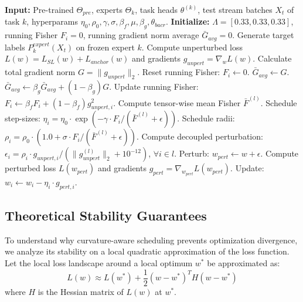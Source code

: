 \documentclass{article}
\theoremstyle{plain}
\theoremstyle{definition}
\theoremstyle{remark}
\begin{document}
\begin{algorithm}[tb]
\caption{Fisher-Guided Curvature-Aware Step-Size Scheduling (FG-CASS)}
\label{alg:fg-cass}
\begin{algorithmic}[1]
\STATE \textbf{Input:} Pre-trained $\Theta_{pre}$, experts $\Theta_k$, task heads $\theta^{(k)}$, test stream batches $X_t$ of task $k$, hyperparams $\eta_0, \rho_0, \gamma, \sigma, \beta_f, \mu, \beta_g, \theta_{bacr}$.
\STATE \textbf{Initialize:} $\Lambda = [0.33, 0.33, 0.33]$, running Fisher $F_i = 0$, running gradient norm average $\bar{G}_{avg} = 0$.
    \STATE Generate target labels $P_k^{expert}(X_t)$ on frozen expert $k$.
    \STATE Compute unperturbed loss $L(w) = L_{SL}(w) + L_{anchor}(w)$ and gradients $g_{unpert} = \nabla_w L(w)$.
    \STATE Calculate total gradient norm $G = \|g_{unpert}\|_2$.
        \STATE Reset running Fisher: $F_i \leftarrow 0$.
        \STATE $\bar{G}_{avg} \leftarrow G$.
    \ELSE
        \STATE $\bar{G}_{avg} \leftarrow \beta_g \bar{G}_{avg} + (1 - \beta_g) G$.
    \ENDIF
    \STATE Update running Fisher: $F_i \leftarrow \beta_f F_i + (1 - \beta_f) g_{unpert, i}^2$.
    \STATE Compute tensor-wise mean Fisher $\bar{F}^{(l)}$.
    \STATE Schedule step-sizes: $\eta_i = \eta_0 \cdot \exp(-\gamma \cdot F_i / (\bar{F}^{(l)} + \epsilon))$.
    \STATE Schedule radii: $\rho_i = \rho_0 \cdot (1.0 + \sigma \cdot F_i / (\bar{F}^{(l)} + \epsilon))$.
    \STATE Compute decoupled perturbation: $\epsilon_i = \rho_i \cdot g_{unpert, i} / (\|g_{unpert}^{(l)}\|_2 + 10^{-12})$, $\forall i \in l$.
    \STATE Perturb: $w_{pert} \leftarrow w + \epsilon$.
    \STATE Compute perturbed loss $L(w_{pert})$ and gradients $g_{pert} = \nabla_{w_{pert}} L(w_{pert})$.
    \STATE Update: $w_i \leftarrow w_i - \eta_i \cdot g_{pert, i}$.
\ENDFOR
\end{algorithmic}
\end{algorithm}

\subsection{Theoretical Stability Guarantees}
To understand why curvature-aware scheduling prevents optimization divergence, we analyze its stability on a local quadratic approximation of the loss function.
Let the local loss landscape around a local optimum $w^*$ be approximated as:
\begin{equation}
L(w) \approx L(w^*) + \frac{1}{2} (w - w^*)^T H (w - w^*)
\end{equation}
where $H$ is the Hessian matrix of $L(w)$ at $w^*$.
\end{document}
